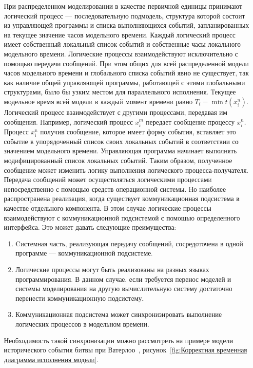 При распределенном моделировании в качестве первичной единицы принимают логический процесс --- последовательную подмодель, структура которой состоит из управляющей программы и списка выполняющихся событий, запланированных на текущее значение часов модельного времени. Каждый логический процесс имеет собственный локальный список событий и собственные часы локального модельного времени. Логические процессы взаимодействуют исключительно с помощью передачи сообщений.
При этом общих для всей распределенной модели часов модельного времени и глобального списка событий явно не существует, так как наличие общей управляющей программы, работающей с этими глобальными структурами, было бы узким местом для параллельного исполнения.
Текущее модельное время всей модели в каждый момент времени равно $T_i=\min t(x_i^n)$. Логический процесс взаимодействует с другими процессами, передавая им сообщения. Например, логический процесс $x_i^m$ передает сообщение процессу $x_i^n$. Процесс $x_i^n$ получив сообщение, которое имеет форму события, вставляет это событие в упорядоченный список своих локальных событий в соответствии со значением модельного времени. Управляющая программа начинает выполнять модифицированный список локальных событий. Таким образом, полученное сообщение может изменить логику выполнения логического процесса-получателя. Передача сообщений может осуществляться логическими процессами непосредственно с помощью средств операционной системы. Но наиболее распространена реализация, когда существует коммуникационная подсистема в качестве отдельного компонента. В этом случае логические процессы взаимодействуют с коммуникационной подсистемой с помощью определенного интерфейса. Это может давать следующие преимущества:
\begin{enumerate}
\item Cистемная часть, реализующая передачу сообщений, сосредоточена в одной программе --- коммуникационной подсистеме.
\item Логические процессы могут быть реализованы на разных языках программирования.  В данном случае, если требуется перенос моделей и системы моделирования на другую вычислительную систему достаточно перенести коммуникационную подсистему.
\item Коммуникационная подсистема может синхронизировать выполнение логических процессов в модельном времени.
\end{enumerate}

Необходимость такой синхронизации можно рассмотреть на примере модели исторического события битвы при Ватерлоо~\cite{napoleon}, рисунок~\ref{fig:Корректная временная диаграмма исполнения модели}.

